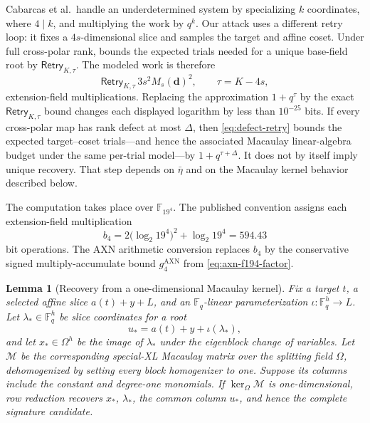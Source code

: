 \documentclass[11pt]{article}
\newtheorem{lemma}[lemma]{Lemma}
\newcommand{\F}{\mathbb F}
\begin{document}
Cabarcas et al.\ handle an underdetermined system by specializing $k$
coordinates, where $4\mid k$, and multiplying the work by $q^k$.  Our attack
uses a different retry loop: it fixes a $4s$-dimensional slice and samples the
target and affine coset.  Under full cross-polar rank,
 bounds the expected trials needed for a unique
base-field root by $\mathsf{Retry}_{K,\tau}$.  The modeled work is therefore
\begin{equation}\label{eq:special-xl-cost}
 \mathsf{Retry}_{K,\tau}\,3s^2M_s(\mathbf d)^2,
 \qquad \tau=K-4s,
\end{equation}
extension-field multiplications.  Replacing the approximation $1+q^\tau$ by
the exact $\mathsf{Retry}_{K,\tau}$ bound changes each displayed logarithm by
less than $10^{-25}$ bits.
If every cross-polar map has rank defect at most $\Delta$, then
\eqref{eq:defect-retry} bounds the expected target--coset trials---and hence
the associated Macaulay linear-algebra budget under the same per-trial
model---by $1+q^{\tau+\Delta}$.  It does not by itself imply unique
recovery.  That step depends on $\bar\eta$ and
on the Macaulay kernel behavior described below.

The computation takes place over $\F_{19^4}$.  The published convention assigns
each extension-field multiplication
\begin{equation}\label{eq:bitop-conversion}
 b_4=2\bigl(\log_2 19^4\bigr)^2+\log_2 19^4=594.43
\end{equation}
bit operations.  The AXN arithmetic conversion replaces $b_4$ by the conservative
signed multiply-accumulate bound $g_4^{\mathrm{AXN}}$ from
\eqref{eq:axn-f194-factor}.

\begin{lemma}[Recovery from a one-dimensional Macaulay kernel]\label{lem:macaulay-recovery}
Fix a target $t$, a selected affine slice $a(t)+y+L$, and an
$\F_q$-linear parameterization $\iota:\F_q^h\to L$.  Let $\lambda_*\in\F_q^h$ be slice coordinates for a
root
\[
  u_*=a(t)+y+\iota(\lambda_*),
\]
and let $x_*\in\Omega^h$ be the image of $\lambda_*$ under the eigenblock
change of variables.  Let $\mathcal M$ be the corresponding special-XL
Macaulay matrix over the splitting field $\Omega$, dehomogenized by setting
every block homogenizer to one.  Suppose its columns include the constant and
degree-one monomials.  If $\ker_\Omega\mathcal M$ is one-dimensional, row
reduction recovers $x_*$, $\lambda_*$, the common column $u_*$, and hence the
complete signature candidate.
\end{lemma}
\end{document}

